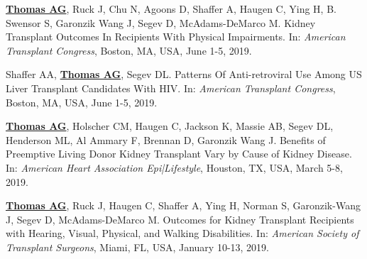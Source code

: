 \documentclass[10pt]{article}
\makeatletter
\newlength{\bibhang}
\newlength{\bibsep}
 {\@listi \global\bibsep\itemsep \global\advance\bibsep by\parsep}
\newenvironment{bibenum*}
  {\renewcommand\labelenumi{[\theenumi]}%
   \etaremune[
     topsep=0pt,
     itemsep=\bibsep,
     parsep=0pt,partopsep=0pt,
     itemindent=-\bibhang,
     leftmargin={\bibhang+\widthof{[999]}}]}
  {\endetaremune}
\makeatother
\begin{document}
\begin{bibenum*}

\item \underline{\textbf{Thomas AG}}, Ruck J, Chu N, Agoons D, Shaffer A,
  Haugen C, Ying H, B. Swensor S, Garonzik Wang J, Segev D, McAdams-DeMarco M.
  Kidney Transplant Outcomes In Recipients With Physical Impairments.
  In: \emph{American Transplant Congress},
  Boston, MA, USA, June 1-5, 2019.

\item Shaffer AA, \underline{\textbf{Thomas AG}}, Segev DL.
  Patterns Of Anti-retroviral Use Among US Liver Transplant
  Candidates With HIV.
  In: \emph{American Transplant Congress},
  Boston, MA, USA, June 1-5, 2019.

\item \underline{\textbf{Thomas AG}}, Holscher CM, Haugen C, Jackson K, Massie AB,
  Segev DL, Henderson ML, Al Ammary F, Brennan D, Garonzik Wang J.
  Benefits of Preemptive Living Donor Kidney Transplant Vary by
  Cause of Kidney Disease.
  In: \emph{American Heart Association Epi|Lifestyle},
  Houston, TX, USA, March 5-8, 2019.

\item \underline{\textbf{Thomas AG}}, Ruck J, Haugen C, Shaffer A, Ying H,
  Norman S, Garonzik-Wang J, Segev D, McAdams-DeMarco M.
  Outcomes for Kidney Transplant Recipients with Hearing, Visual,
  Physical, and Walking Disabilities.
  In: \emph{American Society of Transplant Surgeons},
  Miami, FL, USA, January 10-13, 2019.




\end{bibenum*}
\end{document}

